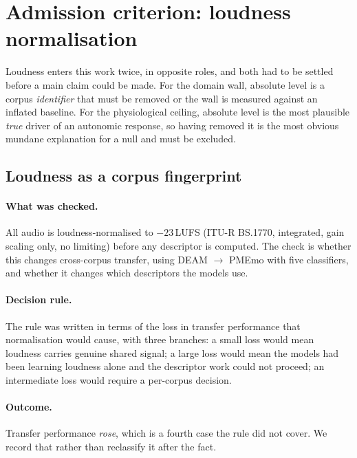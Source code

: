 \section{Admission criterion: loudness normalisation}

Loudness enters this work twice, in opposite roles, and both had to be settled before
a main claim could be made. For the domain wall, absolute level is a corpus
\emph{identifier} that must be removed or the wall is measured against an inflated
baseline. For the physiological ceiling, absolute level is the most plausible
\emph{true} driver of an autonomic response, so having removed it is the most
obvious mundane explanation for a null and must be excluded.

\subsection{Loudness as a corpus fingerprint}

\paragraph{What was checked.}
All audio is loudness-normalised to $-23$\,LUFS (ITU-R BS.1770, integrated, gain
scaling only, no limiting) before any descriptor is computed. The check is whether
this changes cross-corpus transfer, using DEAM $\rightarrow$ PMEmo with five
classifiers, and whether it changes which descriptors the models use.

\paragraph{Decision rule.}
The rule was written in terms of the loss in transfer performance that normalisation
would cause, with three branches: a small loss would mean loudness carries genuine
shared signal; a large loss would mean the models had been learning loudness alone
and the descriptor work could not proceed; an intermediate loss would require a
per-corpus decision.

\paragraph{Outcome.}
Transfer performance \emph{rose}, which is a fourth case the rule did not cover. We
record that rather than reclassify it after the fact.

